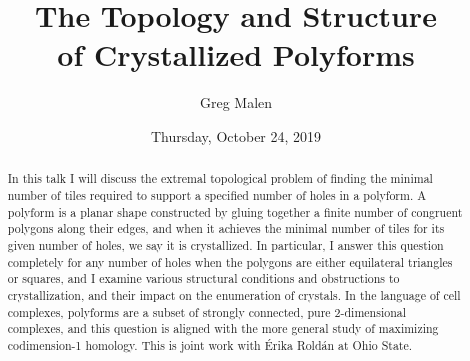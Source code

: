 \documentclass{UAmathtalk}
\author{Greg Malen}
\title{The Topology and Structure\\ of Crystallized Polyforms}
\date{Thursday, October 24, 2019}
\begin{document}
\maketitle

\begin{abstract}
In this talk I will discuss the extremal topological problem of finding the minimal number of tiles required to support a specified number of holes in a polyform. A polyform is a planar shape constructed by gluing together a finite number of congruent polygons along their edges, and when it achieves the minimal number of tiles for its given number of holes, we say it is crystallized. In particular, I answer this question completely for any number of holes when the polygons are either equilateral triangles or squares, and I examine various structural conditions and obstructions to crystallization, and their impact on the enumeration of crystals. In the language of cell complexes, polyforms are a subset of strongly connected, pure 2-dimensional complexes, and this question is aligned with the more general study of maximizing codimension-1 homology. This is joint work with Érika Roldán at Ohio State.
\end{abstract}
\end{document}
